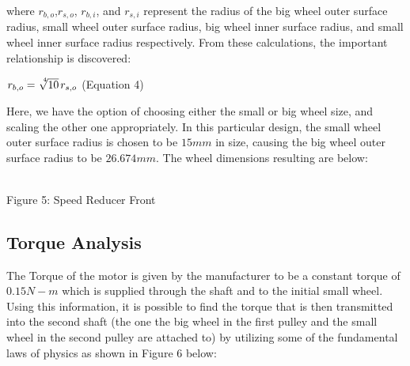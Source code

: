 \documentclass{article}
\begin{document}
where $r_{b,o}$,$r_{s,o}$, $r_{b,i}$, and $r_{s,i}$ represent the radius of the big wheel outer surface radius, small wheel outer surface radius, big wheel inner surface radius, and small wheel inner surface radius respectively. From these calculations, the important relationship is discovered:

\begin{center}
$r_{b,o} = \sqrt[\leftroot{-3}\uproot{3}4]{10} \hspace{0.02in}r_{s,o}$ (Equation 4)
\end{center}

Here, we have the option of choosing either the small or big wheel size, and scaling the other one appropriately. In this particular design, the small wheel outer surface radius is chosen to be $15mm$ in size, causing the big wheel outer surface radius to be $26.674mm$. The wheel dimensions resulting are below:

\begin{center}
\\
\scriptsize{
Figure 5: Speed Reducer Front
}
\end{center}

\subsection{Torque Analysis}
The Torque of the motor is given by the manufacturer to be a constant torque of $0.15N-m$ which is supplied through the shaft and to the initial small wheel. Using this information, it is possible to find the torque that is then transmitted into the second shaft (the one the big wheel in the first pulley and the small wheel in the second pulley are attached to) by utilizing some of the fundamental laws of physics as shown in Figure 6 below:
\end{document}

